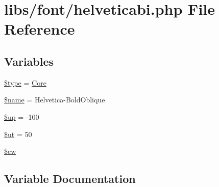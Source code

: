 \hypertarget{helveticabi_8php}{}\section{libs/font/helveticabi.php File Reference}
\label{helveticabi_8php}
\subsection*{Variables}
\begin{DoxyCompactItemize}
\item 
\hyperlink{helveticabi_8php_a9a4a6fba2208984cabb3afacadf33919}{\$type} = \textquotesingle{}\hyperlink{class_core}{Core}\textquotesingle{}
\item 
\hyperlink{helveticabi_8php_ab2fc40d43824ea3e1ce5d86dee0d763b}{\$name} = \textquotesingle{}Helvetica-\/Bold\+Oblique\textquotesingle{}
\item 
\hyperlink{helveticabi_8php_a6b5ad2ac55f9df46e8f34e78fbd6f176}{\$up} = -\/100
\item 
\hyperlink{helveticabi_8php_aadd3f841051043ee58e587e840e8dd0b}{\$ut} = 50
\item 
\hyperlink{helveticabi_8php_ac2951b03dbb0317e6c61ec920b7479dc}{\$cw}
\end{DoxyCompactItemize}


\subsection{Variable Documentation}
\hypertarget{helveticabi_8php_ac2951b03dbb0317e6c61ec920b7479dc}{}
